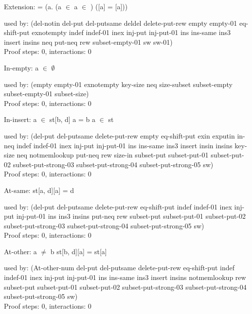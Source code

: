\documentclass[a4paper]{article}
\begin{document}
\raggedright
              
Extension: 
 \Fol {} =  \Equiv (\All a. (a $\in$  \Equiv a $\in$ ) \And ([a] = [a]))


used by: (del-notin del-put del-putsame deldel delete-put-rew empty
          empty-01 eq-shift-put exnotempty indef indef-01 inex inj-put
          inj-put-01 ins ins-same ins3 insert insins neq put-neq rew
          subset-empty-01 sw sw-01)\\
Proof steps: 0, interactions: 0

\medskip

In-empty: 
 \Fol \Not a $\in$ $\emptyset$


used by: (empty empty-01 exnotempty key-size neq size-subset
          subset-empty subset-empty-01 subset-size)\\
Proof steps: 0, interactions: 0

\medskip

In-insert: 
 \Fol a $\in$ st[b, d] \Equiv a = b \Or a $\in$ st


used by: (del-put del-putsame delete-put-rew empty eq-shift-put exin
          exputin in-neq indef indef-01 inex inj-put inj-put-01 ins
          ins-same ins3 insert insin insins key-size neq notmemlookup
          put-neq rew size-in subset-put subset-put-01 subset-put-02
          subset-put-strong-03 subset-put-strong-04
          subset-put-strong-05 sw)\\
Proof steps: 0, interactions: 0

\medskip

At-same: 
 \Fol st[a, d][a] = d


used by: (del-put del-putsame delete-put-rew eq-shift-put indef
          indef-01 inex inj-put inj-put-01 ins ins3 insins put-neq rew
          subset-put subset-put-01 subset-put-02 subset-put-strong-03
          subset-put-strong-04 subset-put-strong-05 sw)\\
Proof steps: 0, interactions: 0

\medskip

At-other: 
 \Fol a $\neq$ b \Imp st[b, d][a] = st[a]


used by: (At-other-num del-put del-putsame delete-put-rew eq-shift-put
          indef indef-01 inex inj-put inj-put-01 ins ins-same ins3
          insert insins notmemlookup rew subset-put subset-put-01
          subset-put-02 subset-put-strong-03 subset-put-strong-04
          subset-put-strong-05 sw)\\
Proof steps: 0, interactions: 0
\end{document}
